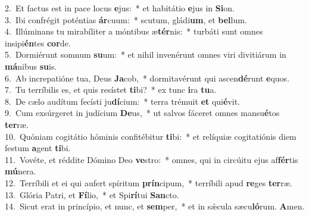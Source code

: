 {2.~}Et factus est in pace locus \textbf{e}jus:~* et habitátio \textbf{e}jus in \textbf{Si}on.\\
{3.~}Ibi confrégit poténtias \textbf{ár}cuum:~* scutum, gládi\textbf{um}, et \textbf{bel}lum.\\
{4.~}Illúminans tu mirabíliter a móntibus æ\textbf{tér}nis:~* turbáti sunt omnes insipi\textbf{én}tes \textbf{cor}de.\\
{5.~}Dormiérunt somnum \textbf{su}um:~* et nihil invenérunt omnes viri divitiárum in \textbf{má}nibus \textbf{su}is.\\
{6.~}Ab increpatióne tua, Deus \textbf{Ja}cob,~* dormitavérunt qui ascen\textbf{dé}runt \textbf{e}quos.\\
{7.~}Tu terríbilis es, et quis resístet \textbf{ti}bi?~* ex tunc \textbf{i}ra \textbf{tu}a.\\
{8.~}De cælo audítum fecísti ju\textbf{dí}cium:~* terra trémuit \textbf{et} qui\textbf{é}vit.\\
{9.~}Cum exsúrgeret in judícium \textbf{De}us,~* ut salvos fáceret omnes mansu\textbf{é}tos \textbf{ter}ræ.\\
{10.~}Quóniam cogitátio hóminis confitébitur \textbf{ti}bi:~* et relíquiæ cogitatiónis diem festum \textbf{a}gent \textbf{ti}bi.\\
{11.~}Vovéte, et réddite Dómino Deo \textbf{ve}stro:~* omnes, qui in circúitu ejus af\textbf{fér}tis \textbf{mú}nera.\\
{12.~}Terríbili et ei qui aufert spíritum \textbf{prín}cipum,~* terríbili apud \textbf{re}ges \textbf{ter}ræ.\\
{13.~}Glória Patri, et \textbf{Fí}lio,~* et Spi\textbf{rí}tui \textbf{San}cto.\\
{14.~}Sicut erat in princípio, et nunc, et \textbf{sem}per,~* et in sǽcula sæcu\textbf{ló}rum. \textbf{A}men.\\
